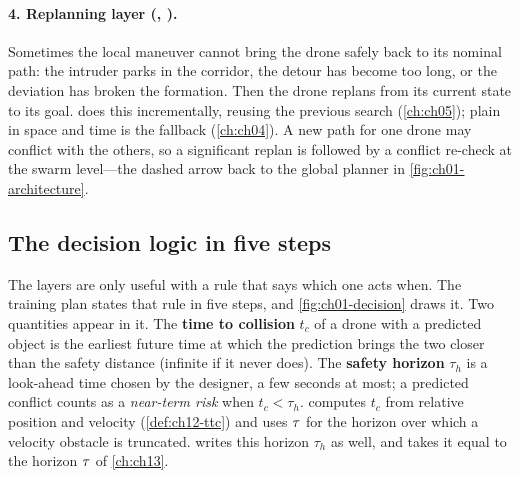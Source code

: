 \paragraph{4. Replanning layer (\dstarlite, \astar).}
Sometimes the local maneuver cannot bring the drone safely back to its nominal path:
the intruder parks in the corridor, the detour has become too long, or the deviation
has broken the formation. Then the drone replans from its current state to its goal.
\dstarlite \cite{koenig2002dstarlite} does this incrementally, reusing the previous
search (\cref{ch:ch05}); plain \astar in space and time is the fallback
(\cref{ch:ch04}). A new path for one drone may conflict with the others, so a
significant replan is followed by a conflict re-check at the swarm level---the dashed
arrow back to the global planner in \cref{fig:ch01-architecture}.

\subsection{The decision logic in five steps}
\label{sec:ch01-decision}

The layers are only useful with a rule that says which one acts when. The training
plan states that rule in five steps, and \cref{fig:ch01-decision} draws it. Two
quantities appear in it. The \textbf{time to collision}
$t_c$ of a drone with a predicted object is the earliest future time at which the
prediction brings the two closer than the safety distance (infinite if it never does).
The \textbf{safety horizon} $\tau_h$ is a
look-ahead time chosen by the designer, a few seconds at most; a predicted conflict
counts as a \emph{near-term risk} when $t_c<\tau_h$. 
computes $t_c$ from relative position and velocity (\cref{def:ch12-ttc}) and uses
$\tau$ for the horizon over which a velocity obstacle is truncated. 
writes this horizon $\tau_h$ as well, and takes it equal to the \orca horizon $\tau$
of \cref{ch:ch13}.

